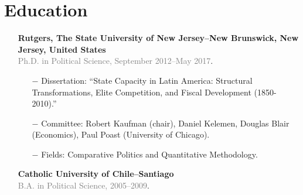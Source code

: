 \section*{Education}

\begin{itemize}
  \item[\textcolor{gray}{\textbullet}] {\bf Rutgers, The State University of New Jersey--New Brunswick, New Jersey, United States}\\
  \textcolor{gray}{Ph.D. in Political Science, September 2012--May 2017}.
    	\begin{itemize}
      		\item[$-$] Dissertation: ``State Capacity in Latin America: Structural Transformations, Elite Competition, and Fiscal Development (1850-2010).''
      		\item[$-$] Committee: Robert Kaufman (chair), Daniel Kelemen, Douglas Blair (Economics), Paul Poast (University of Chicago).
          \item[$-$] Fields: Comparative Politics and Quantitative Methodology.
		  \end{itemize}

\item[\textcolor{gray}{\textbullet}] {\bf Catholic University of Chile--Santiago}\\
\textcolor{gray}{B.A. in Political Science, 2005--2009}.
\end{itemize}
